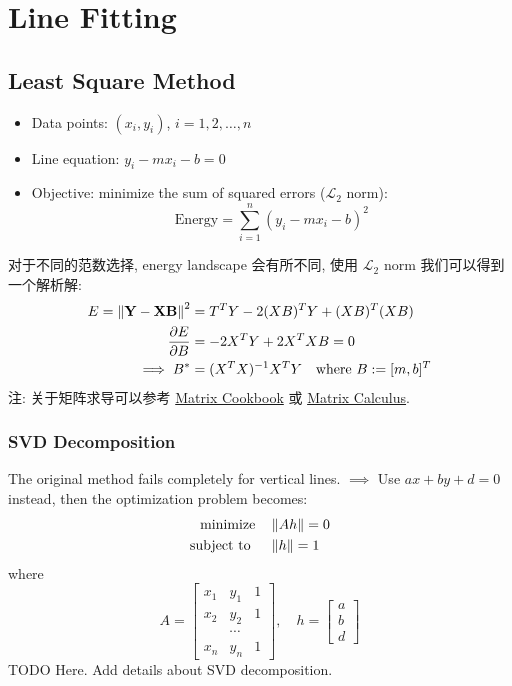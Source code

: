 \section{Line Fitting}
\subsection{Least Square Method}
\begin{itemize}
    \item Data points: $(x_i, y_i)$, $i=1,2,\ldots,n$
    \item Line equation: $y_i - mx_i - b = 0$
    \item Objective: minimize the sum of squared errors ($\mathcal{L}_2$ norm): 
    \[
    \text{Energy} = \sum_{i=1}^{n} (y_i - mx_i - b)^2
    \]
\end{itemize}
对于不同的范数选择, energy landscape 会有所不同, 使用 $\mathcal{L}_2$ norm 我们可以得到一个解析解:
\begin{align*}
    E = \left \Vert  \mathbf{Y} - \mathbf{X} \mathbf{B}  \right \Vert^2 &= T^T Y - 2 (XB)^T Y + (XB)^T (XB) \\
    \frac{\partial E}{\partial B} &= - 2 X^T Y + 2 X^T X B = 0  \\
    \implies B^* &= (X^T X)^{-1} X^T Y \quad \text{where } B := [m, b]^T
\end{align*}
注: 关于矩阵求导可以参考 \href{https://www.math.uwaterloo.ca/~hwolkowi/matrixcookbook.pdf}{Matrix Cookbook} 或 \href{https://ccrma.stanford.edu/~dattorro/matrixcalc.pdf}{Matrix Calculus}.
\subsubsection{SVD Decomposition}
The original method fails completely for vertical lines. $\implies$ Use $ax + by + d = 0$ instead, then the optimization problem becomes: 
\begin{align*}
    \text{minimize} &\quad \left \Vert A h \right \Vert = 0 \\ 
    \text{subject to } &\quad \left \Vert h \right \Vert = 1
\end{align*}
where 
\[
    \renewcommand{\arraystretch}{0.85}
    A = \begin{bmatrix}
        x_1 & y_1 & 1 \\
        x_2 & y_2 & 1\\
        & \cdots &  \\
        x_n & y_n & 1
    \end{bmatrix}, \quad h = \begin{bmatrix}
        a \\ b \\ d
    \end{bmatrix}
\]
TODO Here. Add details about SVD decomposition. 

